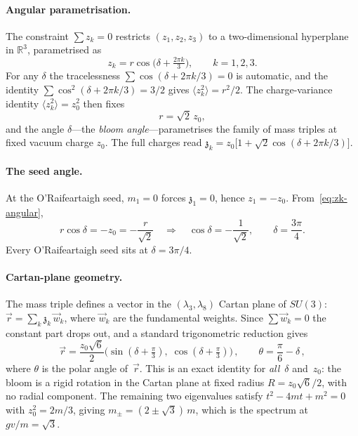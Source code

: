 \documentclass[12pt,a4paper]{article}
\newcommand{\zch}{\mathfrak{z}}
\begin{document}
\paragraph{Angular parametrisation.}
The constraint $\sum z_k = 0$ restricts $(z_1,z_2,z_3)$ to a
two-dimensional hyperplane in $\mathbb{R}^3$, parametrised as
\begin{equation}\label{eq:zk-angular}
  z_k = r\cos\!\bigl(\delta + \tfrac{2\pi k}{3}\bigr), \qquad k=1,2,3.
\end{equation}
For any $\delta$ the tracelessness $\sum\cos(\delta+2\pi k/3)=0$ is
automatic, and the identity
$\sum\cos^2(\delta+2\pi k/3) = 3/2$ gives
$\langle z_k^2\rangle = r^2/2$.
The charge-variance identity $\langle z_k^2\rangle = z_0^2$ then fixes
\begin{equation}
  r = \sqrt{2}\,z_0,
\end{equation}
and the angle $\delta$---the \emph{bloom angle}---parametrises the family
of mass triples at fixed vacuum charge $z_0$.
The full charges read
$\zch_k = z_0\bigl[1 + \sqrt{2}\cos(\delta + 2\pi k/3)\bigr]$.

\paragraph{The seed angle.}
At the O'Raifeartaigh seed, $m_1=0$ forces $\zch_1=0$, hence
$z_1 = -z_0$.  From~\eqref{eq:zk-angular},
\begin{equation}
  r\cos\delta = -z_0 = -\frac{r}{\sqrt{2}}
  \quad\Longrightarrow\quad
  \cos\delta = -\frac{1}{\sqrt{2}},
  \qquad \delta = \frac{3\pi}{4}.
\end{equation}
Every O'Raifeartaigh seed sits at $\delta=3\pi/4$.

\paragraph{Cartan-plane geometry.}
The mass triple defines a vector in the $(\lambda_3,\lambda_8)$ Cartan
plane of $SU(3)$:
$\vec{r} = \sum_{k} \zch_k\,\vec{w}_k$,
where $\vec{w}_k$ are the fundamental weights.
Since $\sum \vec{w}_k = 0$ the constant part drops out, and a
standard trigonometric reduction gives
\begin{equation}
\vec{r} = \frac{z_0\sqrt{6}}{2}
\bigl(\sin(\delta+\tfrac{\pi}{3}),\;
      \cos(\delta+\tfrac{\pi}{3})\bigr)\,,
\qquad \theta = \frac{\pi}{6} - \delta\,,
\end{equation}
where $\theta$ is the polar angle of~$\vec{r}$.
This is an exact identity for \emph{all}~$\delta$ and~$z_0$:
the bloom is a rigid rotation in the Cartan plane at fixed
radius $R = z_0\sqrt{6}/2$, with no radial component.
The remaining two eigenvalues satisfy
$t^2 - 4mt + m^2 = 0$
with $z_0^2 = 2m/3$, giving $m_\pm = (2\pm\sqrt{3})\,m$, which is the
spectrum at $gv/m=\sqrt{3}$.
\end{document}
